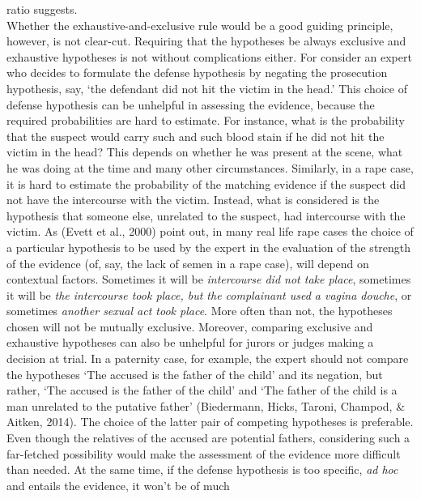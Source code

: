 \documentclass[10pt,dvipsnames,enabledeprecatedfontcommands]{scrartcl}
\begin{document}
ratio suggests.\\
Whether the exhaustive-and-exclusive rule would be a good guiding
principle, however, is not clear-cut. Requiring that the hypotheses be
always exclusive and exhaustive hypotheses is not without complications
either. For consider an expert who decides to formulate the defense
hypothesis by negating the prosecution hypothesis, say, `the defendant
did not hit the victim in the head.' This choice of defense hypothesis
can be unhelpful in assessing the evidence, because the required
probabilities are hard to estimate. For instance, what is the
probability that the suspect would carry such and such blood stain if he
did not hit the victim in the head? This depends on whether he was
present at the scene, what he was doing at the time and many other
circumstances. Similarly, in a rape case, it is hard to estimate the
probability of the matching evidence if the suspect did not have the
intercourse with the victim. Instead, what is considered is the
hypothesis that someone else, unrelated to the suspect, had intercourse
with the victim. As (Evett et al., 2000) point out, in many real life
rape cases the choice of a particular hypothesis to be used by the
expert in the evaluation of the strength of the evidence (of, say, the
lack of semen in a rape case), will depend on contextual factors.
Sometimes it will be \emph{intercourse did not take place}, sometimes it
will be
\emph{the intercourse took place, but the complainant used a vagina douche},
or sometimes \emph{another sexual act took place}. More often than not,
the hypotheses chosen will not be mutually exclusive.
Moreover, comparing exclusive and exhaustive hypotheses can also be
unhelpful for jurors or judges making a decision at trial. In a
paternity case, for example, the expert should not compare the
hypotheses `The accused is the father of the child' and its negation,
but rather, `The accused is the father of the child' and `The father of
the child is a man unrelated to the putative father' (Biedermann, Hicks,
Taroni, Champod, \& Aitken, 2014). The choice of the latter pair of
competing hypotheses is preferable. Even though the relatives of the
accused are potential fathers, considering such a far-fetched
possibility would make the assessment of the evidence more difficult
than needed. At the same time, if the defense hypothesis is too
specific, \textit{ad hoc} and entails the evidence, it won't be of much
\end{document}
